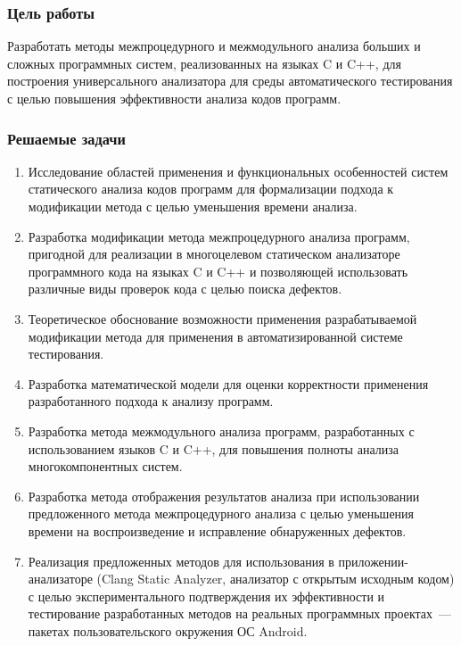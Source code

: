 \documentclass[hyperref={pdfpagelabels=false}]{beamer}
\begin{document}
\begin{frame}
\frametitle{Цель работы}
Разработать методы межпроцедурного и межмодульного анализа больших и сложных программных систем, реализованных на языках C и C++, для построения универсального анализатора для среды автоматического тестирования с целью повышения эффективности анализа кодов программ.
\end{frame}
\begin{frame}[allowframebreaks]
\frametitle{Решаемые задачи}

\begin{enumerate}
  \item Исследование областей применения и функциональных особенностей систем статического анализа кодов программ для формализации подхода к модификации метода с целью уменьшения времени анализа.
  \item Разработка модификации метода межпроцедурного анализа программ, пригодной для реализации в многоцелевом статическом анализаторе программного кода на языках C и C++ и позволяющей использовать различные виды проверок кода с целью поиска дефектов.
  \item Теоретическое обоснование возможности применения разрабатываемой модификации метода для применения в автоматизированной системе тестирования.
  \item Разработка математической модели для оценки корректности применения разработанного подхода к анализу программ.
  \item Разработка метода межмодульного анализа программ, разработанных с использованием языков C и C++, для повышения полноты анализа многокомпонентных систем.
  \item Разработка метода отображения результатов анализа при использовании предложенного метода межпроцедурного анализа с целью уменьшения времени на воспроизведение и исправление обнаруженных дефектов.
  \item Реализация предложенных методов для использования в приложении-анализаторе (Clang Static Analyzer, анализатор с открытым исходным кодом) с целью экспериментального подтверждения их эффективности и тестирование разработанных методов на реальных программных проектах~--- пакетах пользовательского окружения ОС Android.
\end{enumerate}

\end{frame}
\end{document}
